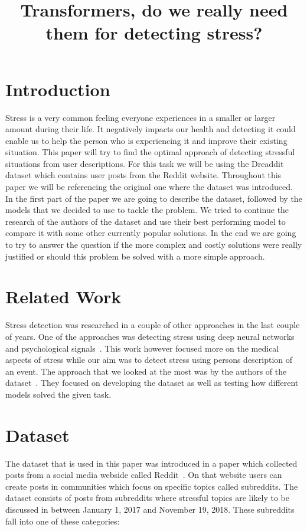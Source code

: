\documentclass[10pt, a4paper]{article}
\title{Transformers, do we really need them for detecting stress?}
\begin{document}
\maketitleabstract

\section{Introduction}

Stress is a very common feeling everyone experiences in a smaller or larger amount during their life.
It negatively impacts our health and detecting it could enable us to help the person who is experiencing it and improve their existing situation.
This paper will try to find the optimal approach of detecting stressful situations from user descriptions.
For this task we will be using the Dreaddit dataset which contains user posts from the Reddit website.
Throughout this paper we will be referencing the original one where the dataset was introduced.
\hfill \break
\hfill \break
In the first part of the paper we are going to describe the dataset, followed by the models that we decided to use to tackle the problem.
We tried to continue the research of the authors of the dataset and use their best performing model to compare it with some other currently popular solutions.
In the end we are going to try to answer the question if the more complex and costly solutions were really justified or should this problem be solved with a more simple approach.

\section{Related Work}
Stress detection was researched in a couple of other approaches in the last couple of years.
One of the approaches was detecting stress using deep neural networks and psychological signals~\citep{stress-neural}.
This work however focused more on the medical aspects of stress while our aim was to detect stress using persons description of an event.
The approach that we looked at the most was by the authors of the dataset~\citep{turcan-mckeown-2019-dreaddit}.
They focused on developing the dataset as well as testing how different models solved the given task.

\section{Dataset}

The dataset that is used in this paper was introduced in a paper which collected posts from a social media webside called Reddit~\citep{turcan-mckeown-2019-dreaddit}.
On that website users can create posts in communities which focus on specific topics called subreddits.
\hfill \break
\hfill \break
The dataset consists of posts from subreddits where stressful topics are likely to be discussed in between January 1, 2017 and November 19, 2018.
These subreddits fall into one of these categories:
\end{document}
